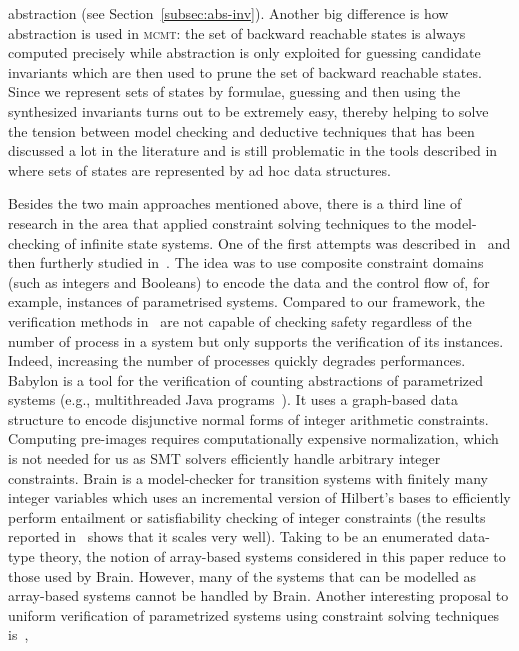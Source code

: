\documentclass{LMCS}
\theoremstyle{plain}\newtheorem{assumption}[thm]{Assumption}
\theoremstyle{plain}\newtheorem{proposition}[thm]{Proposition}
\theoremstyle{plain}\newtheorem{property}[thm]{Property}
\theoremstyle{plain}\newtheorem{example}[thm]{Example}
\theoremstyle{plain}\newtheorem{claim}[thm]{Claim}
\theoremstyle{plain}\newtheorem{lemma}[thm]{Lemma}
\begin{document}
abstraction (see Section~\ref{subsec:abs-inv}).  Another big
difference is how abstraction is used in \textsc{mcmt}: the set of
backward reachable states is always computed precisely while
abstraction is only exploited for guessing candidate invariants which
are then used to prune the set of backward reachable states.  Since we
represent sets of states by formulae, guessing and then using the synthesized invariants turns out
to be extremely easy, thereby helping to solve the tension between
model checking and deductive techniques that has been discussed a lot
in the literature and is still problematic in the tools described
in~\cite{tacas06,cav06}
where sets of states are represented by ad hoc data structures.

Besides the two main approaches mentioned above, there is a third line
of research in the area that applied constraint solving techniques to
the model-checking of infinite state systems.  One of the first
attempts was described in~\cite{bultan-gerber-pugh} and then furtherly
studied in~\cite{composite-mc}.  The idea was to use composite
constraint domains (such as integers and Booleans) to encode the data
and the control flow of, for example, instances of parametrised
systems.  Compared to our framework, the verification methods
in~\cite{bultan-gerber-pugh,composite-mc} are not capable of checking
safety regardless of the number of process in a system but only
supports the verification of its instances.  Indeed, increasing the
number of processes quickly degrades performances.  Babylon is a tool
for the verification of counting abstractions of parametrized systems
(e.g., multithreaded Java programs~\cite{babylon}). It uses a
graph-based data structure to encode disjunctive normal forms of
integer arithmetic constraints.  Computing pre-images requires
computationally expensive normalization, which is not needed for us as
SMT solvers efficiently handle arbitrary integer constraints.  Brain
is a model-checker for transition systems with finitely many integer
variables which uses an incremental version of Hilbert's bases to
efficiently perform entailment or satisfiability checking of integer
constraints (the results reported in~\cite{voronkov-cav02} shows that
it scales very well).  Taking  to be an enumerated data-type
theory, the notion of array-based systems considered in this paper
reduce to those used by Brain.  However, many of the systems that can
be modelled as array-based systems cannot be handled by Brain.
Another interesting proposal to uniform verification of parametrized
systems using constraint solving techniques is~\cite{bouajjani-rew},
\end{document}
